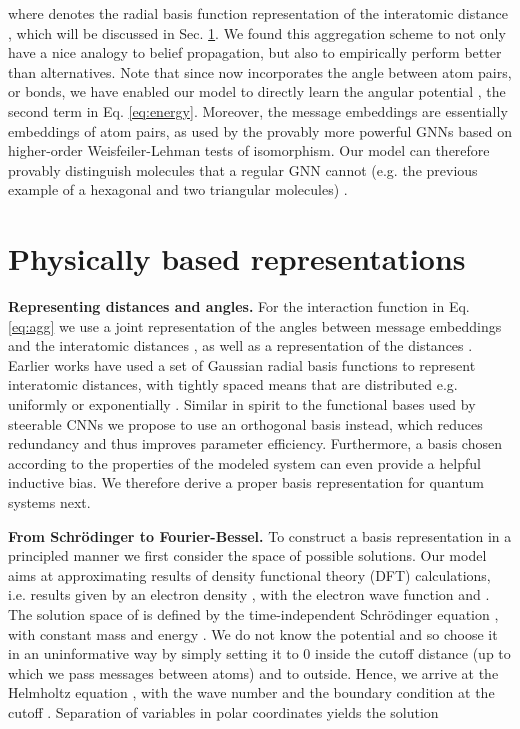 \documentclass{article} \usepackage{iclr2020_conference,times}
\begin{document}
where  denotes the radial basis function representation of the interatomic distance , which will be discussed in Sec. \ref{sec:pbr}. We found this aggregation scheme to not only have a nice analogy to belief propagation, but also to empirically perform better than alternatives. Note that since  now incorporates the angle between atom pairs, or bonds, we have enabled our model to directly learn the angular potential , the second term in Eq. \ref{eq:energy}. Moreover, the message embeddings are essentially embeddings of atom pairs, as used by the provably more powerful GNNs based on higher-order Weisfeiler-Lehman tests of isomorphism. Our model can therefore provably distinguish molecules that a regular GNN cannot (e.g. the previous example of a hexagonal and two triangular molecules) \citep{morris_weisfeiler_2019}.

\section{Physically based representations} \label{sec:pbr}

\textbf{Representing distances and angles.} For the interaction function  in Eq. \ref{eq:agg} we use a joint representation  of the angles  between message embeddings and the interatomic distances , as well as a representation  of the distances . Earlier works have used a set of Gaussian radial basis functions to represent interatomic distances, with tightly spaced means that are distributed e.g. uniformly \citep{schutt_schnet:_2017} or exponentially \citep{unke_physnet:_2019}. Similar in spirit to the functional bases used by steerable CNNs \citep{cohen_steerable_2017,cheng_rotdcf:_2019} we propose to use an orthogonal basis instead, which reduces redundancy and thus improves parameter efficiency. Furthermore, a basis chosen according to the properties of the modeled system can even provide a helpful inductive bias. We therefore derive a proper basis representation for quantum systems next.

\textbf{From Schrödinger to Fourier-Bessel.} To construct a basis representation in a principled manner we first consider the space of possible solutions. Our model aims at approximating results of density functional theory (DFT) calculations, i.e. results given by an electron density , with the electron wave function  and . The solution space of  is defined by the time-independent Schrödinger equation , with constant mass  and energy . We do not know the potential  and so choose it in an uninformative way by simply setting it to 0 inside the cutoff distance  (up to which we pass messages between atoms) and to  outside. Hence, we arrive at the Helmholtz equation , with the wave number  and the boundary condition  at the cutoff . Separation of variables in polar coordinates  yields the solution \citep{griffiths_introduction_2018}
\end{document}
